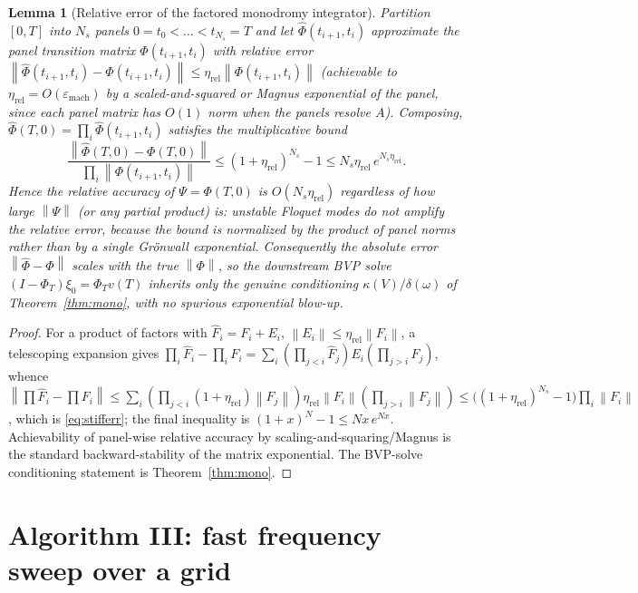 \documentclass{amsart}
\newtheorem{lemma}{Lemma}
\theoremstyle{definition}
\newcommand{\norm}[1]{\left\lVert#1\right\rVert}
\begin{document}
\begin{lemma}[Relative error of the factored monodromy integrator]\label{lem:stiff}
Partition $[0,T]$ into $N_s$ panels $0=t_0<\dots<t_{N_s}=T$ and let
$\hat\Phi(t_{i+1},t_i)$ approximate the panel transition matrix
$\Phi(t_{i+1},t_i)$ with \emph{relative} error
$\norm{\hat\Phi(t_{i+1},t_i)-\Phi(t_{i+1},t_i)}\le\eta_{\mathrm{rel}}
\norm{\Phi(t_{i+1},t_i)}$ (achievable to $\eta_{\mathrm{rel}}=O(\varepsilon_{\mathrm{mach}})$
by a scaled-and-squared or Magnus exponential of the panel, since each panel
matrix has $O(1)$ norm when the panels resolve $A$). Composing,
$\hat\Phi(T,0)=\prod_i\hat\Phi(t_{i+1},t_i)$ satisfies the multiplicative bound
\begin{equation}\label{eq:stifferr}
\frac{\norm{\hat\Phi(T,0)-\Phi(T,0)}}{\prod_i\norm{\Phi(t_{i+1},t_i)}}
\le (1+\eta_{\mathrm{rel}})^{N_s}-1\le N_s\eta_{\mathrm{rel}}\,e^{N_s\eta_{\mathrm{rel}}}.
\end{equation}
Hence the \emph{relative} accuracy of $\Psi=\Phi(T,0)$ is $O(N_s\eta_{\mathrm{rel}})$
\emph{regardless of how large $\norm\Psi$ (or any partial product) is}: unstable
Floquet modes do not amplify the relative error, because the bound is normalized
by the product of panel norms rather than by a single Gr\"onwall exponential.
Consequently the absolute error $\norm{\hat\Phi-\Phi}$ scales with the true
$\norm\Phi$, so the downstream BVP solve $(I-\Phi_T)\xi_0=\Phi_T v(T)$ inherits
only the genuine conditioning $\kappa(V)/\delta(\omega)$ of
Theorem~\ref{thm:mono}, with no spurious exponential blow-up.
\end{lemma}

\begin{proof}
For a product of factors with $\hat F_i=F_i+E_i$, $\norm{E_i}\le\eta_{\mathrm{rel}}\norm{F_i}$,
a telescoping expansion gives
$\prod_i\hat F_i-\prod_i F_i=\sum_i(\prod_{j<i}\hat F_j)E_i(\prod_{j>i}F_j)$,
whence
$\norm{\prod\hat F_i-\prod F_i}\le\sum_i(\prod_{j<i}(1+\eta_{\mathrm{rel}})\norm{F_j})
\eta_{\mathrm{rel}}\norm{F_i}(\prod_{j>i}\norm{F_j})
\le\big((1+\eta_{\mathrm{rel}})^{N_s}-1\big)\prod_i\norm{F_i}$,
which is \eqref{eq:stifferr}; the final inequality is
$(1+x)^N-1\le Nx\,e^{Nx}$. Achievability of panel-wise relative accuracy by
scaling-and-squaring/Magnus is the standard backward-stability of the matrix
exponential. The BVP-solve conditioning statement is Theorem~\ref{thm:mono}.
\end{proof}

\section{Algorithm III: fast frequency sweep over a grid}\label{sec:lift}
\end{document}
